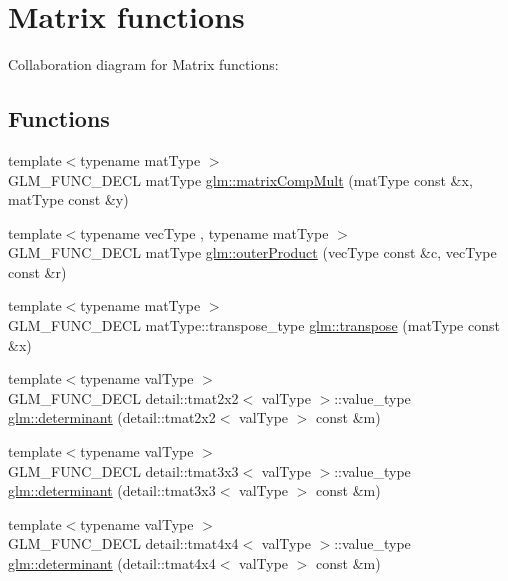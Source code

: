 \hypertarget{group__core__func__matrix}{}\section{Matrix functions}
\label{group__core__func__matrix}
Collaboration diagram for Matrix functions\+:
\subsection*{Functions}
\begin{DoxyCompactItemize}
\item 
{\footnotesize template$<$typename mat\+Type $>$ }\\G\+L\+M\+\_\+\+F\+U\+N\+C\+\_\+\+D\+E\+C\+L mat\+Type \hyperlink{group__core__func__matrix_ga171fac0b8564b1516930bb134fd297b8}{glm\+::matrix\+Comp\+Mult} (mat\+Type const \&x, mat\+Type const \&y)
\item 
{\footnotesize template$<$typename vec\+Type , typename mat\+Type $>$ }\\G\+L\+M\+\_\+\+F\+U\+N\+C\+\_\+\+D\+E\+C\+L mat\+Type \hyperlink{group__core__func__matrix_ga15f67b26edfad8f08aa15048624d8b13}{glm\+::outer\+Product} (vec\+Type const \&c, vec\+Type const \&r)
\item 
{\footnotesize template$<$typename mat\+Type $>$ }\\G\+L\+M\+\_\+\+F\+U\+N\+C\+\_\+\+D\+E\+C\+L mat\+Type\+::transpose\+\_\+type \hyperlink{group__core__func__matrix_gabe31c56ee9cec899aff9b2a5c01c3c28}{glm\+::transpose} (mat\+Type const \&x)
\item 
{\footnotesize template$<$typename val\+Type $>$ }\\G\+L\+M\+\_\+\+F\+U\+N\+C\+\_\+\+D\+E\+C\+L detail\+::tmat2x2$<$ val\+Type $>$\+::value\+\_\+type \hyperlink{group__core__func__matrix_gada4f5f54657a819995c44e42eb3ed104}{glm\+::determinant} (detail\+::tmat2x2$<$ val\+Type $>$ const \&m)
\item 
{\footnotesize template$<$typename val\+Type $>$ }\\G\+L\+M\+\_\+\+F\+U\+N\+C\+\_\+\+D\+E\+C\+L detail\+::tmat3x3$<$ val\+Type $>$\+::value\+\_\+type \hyperlink{group__core__func__matrix_gabc36bd87dfd1e89fb38a39316fb2ff1a}{glm\+::determinant} (detail\+::tmat3x3$<$ val\+Type $>$ const \&m)
\item 
{\footnotesize template$<$typename val\+Type $>$ }\\G\+L\+M\+\_\+\+F\+U\+N\+C\+\_\+\+D\+E\+C\+L detail\+::tmat4x4$<$ val\+Type $>$\+::value\+\_\+type \hyperlink{group__core__func__matrix_gaa089890aa0f13996a0696a4334d99192}{glm\+::determinant} (detail\+::tmat4x4$<$ val\+Type $>$ const \&m)

\end{DoxyCompactItemize}

